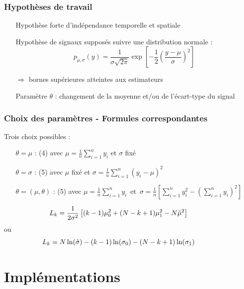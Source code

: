 \documentclass{beamer}
\begin{document}
\begin{frame}
	\frametitle{Hypothèses de travail}
	
	\begin{itemize}
		\item[Hypothèse] forte d'indépendance temporelle et spatiale
		\item[Hypothèse] de signaux supposés suivre une distribution normale :
	\begin{equation}
		p_{\mu, \sigma}(y) = \frac1{\sigma\sqrt{2 \pi}} \exp \left[ -\frac12 \left( \frac{y - \mu}{\sigma} \right)^2 \right]
	\end{equation}
		\item[$\Longrightarrow$] bornes supérieures atteintes aux estimateurs
		\vspace{.4cm}
		\item[Paramètre] $\theta$ : changement de la moyenne et/ou de l'écart-type du signal
	\end{itemize}
\end{frame}

\begin{frame}
	\frametitle{Choix des paramètres - Formules correspondantes}
	Trois choix possibles :
	\vspace*{.3cm}
	\begin{itemize}
		\item[$\theta=\mu$]: (4) avec $\mu=\frac1n\sum_{i=1}^ny_i$ et $\sigma$ fixé
		\vspace*{.2cm}
		\item[$\theta=\sigma$]:  (5) avec $\mu$ fixé et $\sigma=\frac1n\sum_{i=1}^n(y_i-\mu)^2$
		\vspace*{.2cm}
		\item[$\theta=(\mu,\theta)$]: (5) avec \mbox{$\mu=\frac1n\sum_{i=1}^ny_i$ et $\sigma=\frac1n\left[\sum_{i=1}^ny_i^2-(\sum_{i=1}^ny_i)^2\right]$}
	\end{itemize}
	\vspace*{0.8cm}
	\begin{equation}
	\hspace{-1cm}	L_k=\frac 1{2\sigma^2}\left[(k-1)\mu_0^2+(N-k+1)\mu_1^2-N\tilde\mu^2\right]
	\end{equation}
	ou
	\begin{equation}
	\hspace{-1cm}	L_k=N\ln(\tilde\sigma)-(k-1)\ln(\sigma_0)-(N-k+1)\ln(\sigma_1)
	\end{equation}
\end{frame}

\section{Implémentations}
\end{document}
